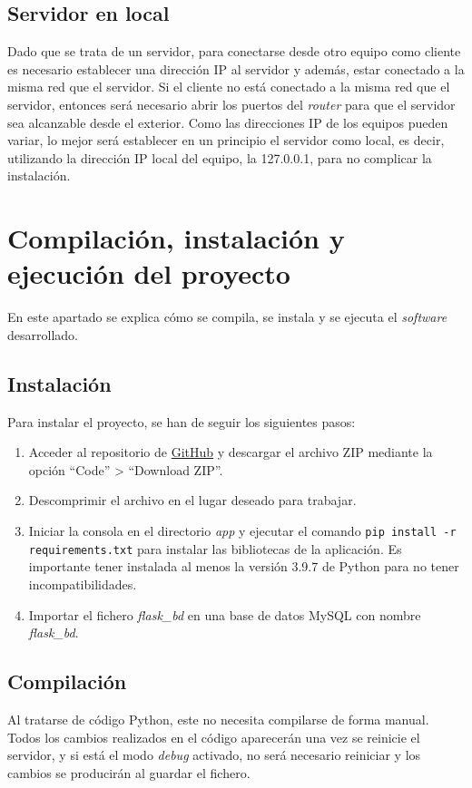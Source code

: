 \subsection{Servidor en local}
Dado que se trata de un servidor, para conectarse desde otro equipo como cliente es necesario establecer una dirección IP al servidor y además, estar conectado a la misma red que el servidor. Si el cliente no está conectado a la misma red que el servidor, entonces será necesario abrir los puertos del \textit{router} para que el servidor sea alcanzable desde el exterior. Como las direcciones IP de los equipos pueden variar, lo mejor será establecer en un principio el servidor como local, es decir, utilizando la dirección IP local del equipo, la 127.0.0.1, para no complicar la instalación.

\section{Compilación, instalación y ejecución del proyecto}
En este apartado se explica cómo se compila, se instala y se ejecuta el \textit{software} desarrollado.

\subsection{Instalación}
Para instalar el proyecto, se han de seguir los siguientes pasos:

\begin{enumerate}
	\item Acceder al repositorio de \href{https://github.com/xam1002/TFG_Deteccion_Parkinson}{GitHub} y descargar el archivo ZIP mediante la opción ``Code'' > ``Download ZIP''.
	\item Descomprimir el archivo en el lugar deseado para trabajar.
	\item Iniciar la consola en el directorio \textit{app} y ejecutar el comando \texttt{pip install -r requirements.txt} para instalar las bibliotecas de la aplicación. Es importante tener instalada al menos la versión 3.9.7 de Python para no tener incompatibilidades.
	\item Importar el fichero \textit{flask\_bd} en una base de datos MySQL con nombre \textit{flask\_bd}.
\end{enumerate}

\subsection{Compilación}
Al tratarse de código Python, este no necesita compilarse de forma manual. Todos los cambios realizados en el código aparecerán una vez se reinicie el servidor, y si está el modo \textit{debug} activado, no será necesario reiniciar y los cambios se producirán al guardar el fichero.

